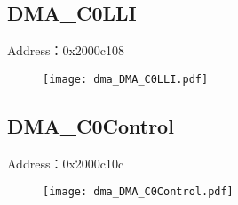 \subsection{DMA\_C0LLI}
\label{dma-DMA-C0LLI}
Address：0x2000c108
 \begin{figure}[H]
\texttt{[image: dma\_DMA\_C0LLI.pdf]}
\end{figure}

\subsection{DMA\_C0Control}
\label{dma-DMA-C0Control}
Address：0x2000c10c
 \begin{figure}[H]
\texttt{[image: dma\_DMA\_C0Control.pdf]}
\end{figure}

